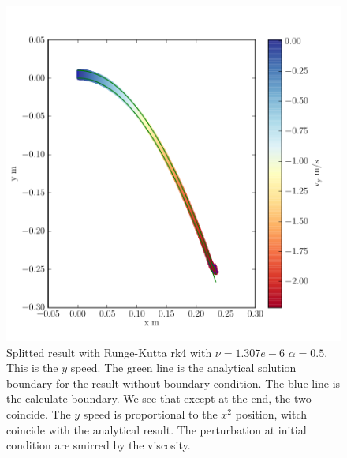 \begin{figure}
	\includegraphics{topology/lateral_jet/plot_9__2_182.pdf}
		\caption{Splitted result with Runge-Kutta rk4 with $\nu=1.307e-6$ $\alpha=0.5$.
	This is the $y$ speed.
	The green line is the analytical solution boundary for the result without boundary condition.
	The blue line is the calculate boundary.
	We see that except at the end, the two coincide.
	The $y$ speed is proportional to the $x^2$ position, witch coincide with the analytical result.
	The perturbation at initial condition are smirred by the viscosity.}
	\label{topo:extrap:lateral:9_2}
\end{figure}



